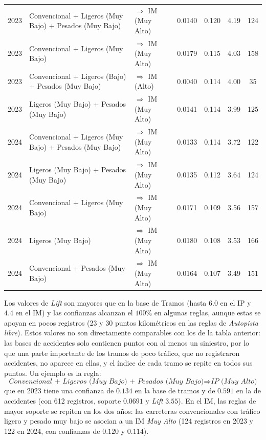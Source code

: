 \documentclass[twoside,a4paper,12pt,onecolumn,openany]{book}
\begin{document}
\begin{table}[H]
{\begin{tabular}{cllcccc}
        2023 & Convencional + Ligeros (Muy Bajo) + Pesados (Muy Bajo) & $\Rightarrow$ IM (Muy Alto) & 0.0140 & 0.120 & 4.19 & 124 \\
        2023 & Convencional + Ligeros (Muy Bajo) & $\Rightarrow$ IM (Muy Alto) & 0.0179 & 0.115 & 4.03 & 158 \\
        2023 & Convencional + Ligeros (Bajo) + Pesados (Muy Bajo) & $\Rightarrow$ IM (Alto) & 0.0040 & 0.114 & 4.00 & 35 \\
        2023 & Ligeros (Muy Bajo) + Pesados (Muy Bajo) & $\Rightarrow$ IM (Muy Alto) & 0.0141 & 0.114 & 3.99 & 125 \\
        \midrule
        2024 & Convencional + Ligeros (Muy Bajo) + Pesados (Muy Bajo) & $\Rightarrow$ IM (Muy Alto) & 0.0133 & 0.114 & 3.72 & 122 \\
        2024 & Ligeros (Muy Bajo) + Pesados (Muy Bajo) & $\Rightarrow$ IM (Muy Alto) & 0.0135 & 0.112 & 3.64 & 124 \\
        2024 & Convencional + Ligeros (Muy Bajo) & $\Rightarrow$ IM (Muy Alto) & 0.0171 & 0.109 & 3.56 & 157 \\
        2024 & Ligeros (Muy Bajo) & $\Rightarrow$ IM (Muy Alto) & 0.0180 & 0.108 & 3.53 & 166 \\
        2024 & Convencional + Pesados (Muy Bajo) & $\Rightarrow$ IM (Muy Alto) & 0.0164 & 0.107 & 3.49 & 151 \\
        \bottomrule
    \end{tabular}
    }
\end{table}

\vspace{0.5cm}

Los valores de \textit{Lift} son mayores que en la base de Tramos (hasta $6.0$ en el IP y $4.4$ en el IM) y las confianzas alcanzan el $100\%$ en algunas reglas, aunque estas se apoyan en pocos registros (23 y 30 puntos kilométricos en las reglas de \textit{Autopista libre}). Estos valores no son directamente comparables con los de la tabla anterior: las bases de accidentes solo contienen puntos con al menos un siniestro, por lo que una parte importante de los tramos de poco tráfico, que no registraron accidentes, no aparece en ellas, y el índice de cada tramo se repite en todos sus puntos. 
Un ejemplo es la regla:
\[
\textit{Convencional + Ligeros (Muy Bajo) + Pesados (Muy Bajo)} \Rightarrow \textit{IP (Muy Alto)}
\] 
que en 2023 tiene una confianza de $0.134$ en la base de tramos y de $0.591$ en la de accidentes (con 612 registros, soporte $0.0691$ y \textit{Lift} $3.55$). En el IM, las reglas de mayor soporte se repiten en los dos años: las carreteras convencionales con tráfico ligero y pesado muy bajo se asocian a un IM \textit{Muy Alto} (124 registros en 2023 y 122 en 2024, con confianzas de $0.120$ y $0.114$).
\end{document}
